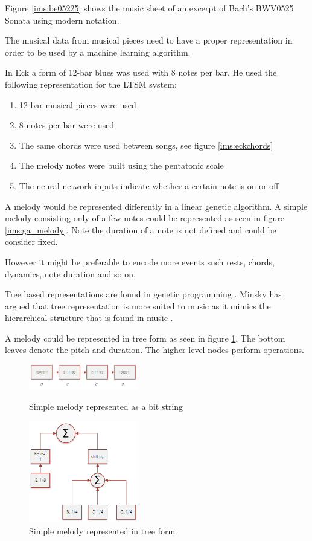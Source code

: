 Figure \ref{ims:be05225} shows the music sheet of an excerpt of Bach's BWV0525 Sonata using modern notation. 

The musical data from musical pieces need to have a proper representation in order to be used by a machine learning algorithm.

In \cite{Eck2002} Eck a form of 12-bar blues was used with 8 notes per bar. 
He used the following representation for the \acs{LTSM} system:
\begin{enumerate}
\item 12-bar musical pieces were used
\item 8 notes per bar were used
\item The same chords were used between songs, see figure \ref{ims:eckchords}
\item The melody notes were built using the pentatonic scale
\item The neural network inputs indicate whether a certain note is on or off
\end{enumerate}

A melody would be represented differently in a linear genetic algorithm.
A simple melody consisting only of a few notes could be represented as seen in figure \ref{ims:ga_melody}. Note the duration of a note is not defined and could be consider fixed.

However it might be preferable to encode more events such rests, chords, dynamics, note duration and so on.

Tree based representations are found in genetic programming \cite{Langdon2008}. Minsky has argued that tree representation is more suited to music as it mimics the hierarchical structure that is found in music \cite{Minsky1992}.

A melody could be represented in tree form as seen in figure \ref{ims:gp_melody}. The bottom leaves denote the pitch and duration. The higher level nodes perform operations.


\begin{figure}
\centering
\begin{minipage}{.5\textwidth}
  \centering
  \includegraphics[width=180px]{../images/ga_melody.png}
  \caption{Simple melody represented as a bit string}
\label{ims:ga_melody}
\end{minipage}%
\begin{minipage}{.5\textwidth}
  \centering
  \includegraphics[width=180px]{../images/gp_melody.png}
  \caption{Simple melody represented in tree form}
\label{ims:gp_melody}
\end{minipage}
\end{figure}

